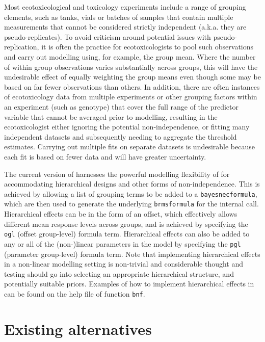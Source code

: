 Most ecotoxicological and toxicology experiments include a range of
grouping elements, such as tanks, vials or batches of samples that
contain multiple measurements that cannot be considered strictly
independent (a.k.a. they are pseudo-replicates). To avoid criticism
around potential issues with pseudo-replication, it is often the
practice for ecotoxicologists to pool such observations and carry out
modelling using, for example, the group mean. Where the number of within
group observations varies substantially across groups, this will have
the undesirable effect of equally weighting the group means even though
some may be based on far fewer observations than others. In addition,
there are often instances of ecotoxicology data from multiple
experiments or other grouping factors within an experiment (such as
genotype) that cover the full range of the predictor variable that
cannot be averaged prior to modelling, resulting in the ecotoxicologist
either ignoring the potential non-independence, or fitting many
independent datasets and subsequently needing to aggregate the threshold
estimates. Carrying out multiple fits on separate datasets is
undesirable because each fit is based on fewer data and will have
greater uncertainty.

The current version of  harnesses the powerful modelling
flexibility of  for accommodating hierarchical designs and
other forms of non-independence. This is achieved by allowing a list of
grouping terms to be added to a \texttt{bayesnecformula}, which are then
used to generate the underlying \texttt{brmsformula} for the 
internal call. Hierarchical effects can be in the form of an offset,
which effectively allows different mean response levels across groups,
and is achieved by specifying the \texttt{ogl} (offset group-level)
formula term. Hierarchical effects can also be added to any or all of
the (non-)linear parameters in the model by specifying the \texttt{pgl}
(parameter group-level) formula term. Note that implementing
hierarchical effects in a non-linear modelling setting is non-trivial
and considerable thought and testing should go into selecting an
appropriate hierarchical structure, and potentially suitable priors.
Examples of how to implement hierarchical effects in  can
be found on the help file of function \texttt{bnf}.

\hypertarget{bnchmrk}{%
\section{Existing alternatives}\label{bnchmrk}}

